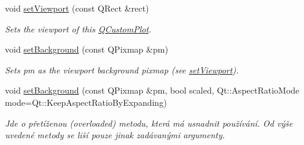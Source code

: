 \begin{DoxyCompactItemize}
\item 
void \hyperlink{classQCustomPlot_a3f9bc4b939dd8aaba9339fd09f273fc4}{set\+Viewport} (const Q\+Rect \&rect)
\begin{DoxyCompactList}\small\item\em Sets the viewport of this \hyperlink{classQCustomPlot}{Q\+Custom\+Plot}. \end{DoxyCompactList}\item 
void \hyperlink{classQCustomPlot_a130358592cfca353ff3cf5571b49fb00}{set\+Background} (const Q\+Pixmap \&pm)
\begin{DoxyCompactList}\small\item\em Sets {\itshape pm} as the viewport background pixmap (see \hyperlink{classQCustomPlot_a3f9bc4b939dd8aaba9339fd09f273fc4}{set\+Viewport}). \end{DoxyCompactList}\item 
void \hyperlink{classQCustomPlot_a8513971d6aa24d8b0d6a68d45b542130}{set\+Background} (const Q\+Pixmap \&pm, bool scaled, Qt\+::\+Aspect\+Ratio\+Mode mode=Qt\+::\+Keep\+Aspect\+Ratio\+By\+Expanding)
\begin{DoxyCompactList}\small\item\em Jde o přetíženou (overloaded) metodu, která má usnadnit používání. Od výše uvedené metody se liší pouze jinak zadávanými argumenty.


\end{DoxyCompactList}
\end{DoxyCompactItemize}
